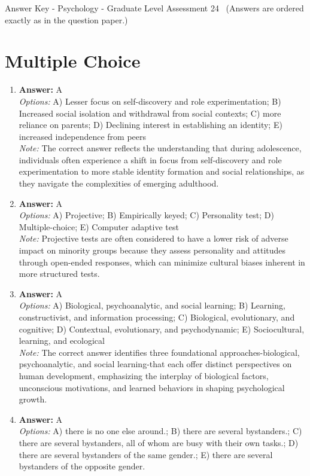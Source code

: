 \documentclass[12pt]{article}
\begin{document}
\begin{center}
Answer Key - Psychology - Graduate Level Assessment 24 \
\small (Answers are ordered exactly as in the question paper.)
\end{center}

\section*{Multiple Choice}
\begin{enumerate}[label=\arabic*.]
\item \textbf{Answer:} A
\\ \textit{Options:} A) Lesser focus on self-discovery and role experimentation; B) Increased social isolation and withdrawal from social contexts; C) more reliance on parents; D) Declining interest in establishing an identity; E) increased independence from peers
\\ \textit{Note:} The correct answer reflects the understanding that during adolescence, individuals often experience a shift in focus from self-discovery and role experimentation to more stable identity formation and social relationships, as they navigate the complexities of emerging adulthood.
\item \textbf{Answer:} A
\\ \textit{Options:} A) Projective; B) Empirically keyed; C) Personality test; D) Multiple-choice; E) Computer adaptive test
\\ \textit{Note:} Projective tests are often considered to have a lower risk of adverse impact on minority groups because they assess personality and attitudes through open-ended responses, which can minimize cultural biases inherent in more structured tests.
\item \textbf{Answer:} A
\\ \textit{Options:} A) Biological, psychoanalytic, and social learning; B) Learning, constructivist, and information processing; C) Biological, evolutionary, and cognitive; D) Contextual, evolutionary, and psychodynamic; E) Sociocultural, learning, and ecological
\\ \textit{Note:} The correct answer identifies three foundational approaches-biological, psychoanalytic, and social learning-that each offer distinct perspectives on human development, emphasizing the interplay of biological factors, unconscious motivations, and learned behaviors in shaping psychological growth.
\item \textbf{Answer:} A
\\ \textit{Options:} A) there is no one else around.; B) there are several bystanders.; C) there are several bystanders, all of whom are busy with their own tasks.; D) there are several bystanders of the same gender.; E) there are several bystanders of the opposite gender.

\end{enumerate}
\end{document}

